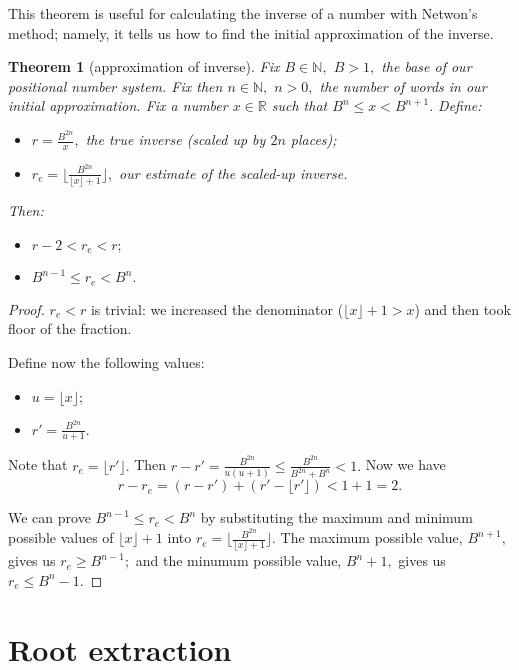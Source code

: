 \documentclass[a4paper,12pt]{article}
\newtheorem{theorem}{Theorem}
\newcommand{\floor}[1] {\lfloor #1 \rfloor}
\begin{document}
This theorem is useful for calculating the inverse of a number with Netwon's method;
namely, it tells us how to find the initial approximation of the inverse.

\begin{theorem}[approximation of inverse]
    Fix $B \in \mathbb{N},$ $B > 1,$ the base of our positional number system.
    Fix then $n \in \mathbb{N},$ $n > 0,$ the number of words in our initial approximation.
    Fix a number $x \in \mathbb{R}$ such that $B^n \le x < B^{n+1}.$
    Define:
    \begin{itemize}
      \item $r = \frac{B^{2n}}{x},$ the true inverse (scaled up by $2n$ places);
      \item $r_e = \floor{\frac{B^{2n}}{\floor{x} + 1}},$ our estimate of the scaled-up inverse.
    \end{itemize}
    Then:
    \begin{itemize}
        \item $r-2 < r_e < r;$
        \item $B^{n-1} \le r_e < B^n.$
    \end{itemize}
\end{theorem}
\begin{proof}
    $r_e < r$ is trivial: we increased the denominator ($\floor{x}+1 > x$) and then took floor of the fraction.

    Define now the following values:
    \begin{itemize}
        \item $u = \floor{x};$
        \item $r' = \frac{B^{2n}}{u + 1}.$
    \end{itemize}
    Note that $r_e = \floor{r'}.$
    Then $r - r' = \frac{B^{2n}}{u(u+1)} \le \frac{B^{2n}}{B^{2n} + B^n} < 1.$
    Now we have $$r - r_e = (r - r') + (r' - \floor{r'}) < 1 + 1 = 2.$$

    We can prove $B^{n-1} \le r_e < B^n$ by substituting the maximum and minimum possible
    values of $\floor{x}+1$ into $r_e = \floor{\frac{B^{2n}}{\floor{x}+1}}.$
    The maximum possible value, $B^{n+1},$ gives us $r_e \ge B^{n-1};$
    and the minumum possible value, $B^{n}+1,$ gives us $r_e \le B^{n} - 1.$
\end{proof}

\section{Root extraction}
\end{document}
